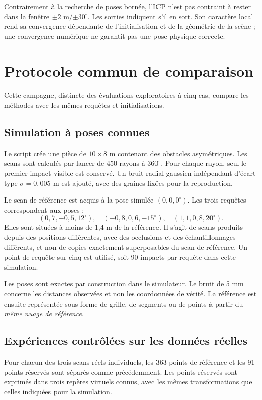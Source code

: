 \documentclass[11pt,a4paper]{article}
\newcommand{\code}[1]{\texttt{\detokenize{#1}}}
\begin{document}
Contrairement à la recherche de poses bornée, l'ICP n'est pas contraint
à rester dans la fenêtre $\pm2$ m/$\pm30^\circ$. Les sorties indiquent
s'il en sort. Son caractère local rend sa convergence dépendante de
l'initialisation et de la géométrie de la scène ; une convergence numérique
ne garantit pas une pose physique correcte.

\section{Protocole commun de comparaison}
Cette campagne, distincte des évaluations exploratoires à cinq cas,
compare les méthodes avec les mêmes requêtes et initialisations.

\subsection{Simulation à poses connues}
Le script \code{comparaison_localisation.py} crée une pièce de
$10\times8$ m contenant des obstacles asymétriques. Les scans sont calculés
par lancer de 450 rayons à $360^\circ$. Pour chaque rayon, seul le premier
impact visible est conservé. Un bruit radial gaussien indépendant d'écart-type
$\sigma=0{,}005$ m est ajouté, avec des graines fixées pour la reproduction.

Le scan de référence est acquis à la pose simulée $(0,0,0^\circ)$.
Les trois requêtes correspondent aux poses :
\[
 (0{,}7,-0{,}5,12^\circ),\quad
 (-0{,}8,0{,}6,-15^\circ),\quad
 (1{,}1,0{,}8,20^\circ).
\]
Elles sont situées à moins de 1,4 m de la référence. Il s'agit de scans
produits depuis des positions différentes, avec des occlusions et des
échantillonnages différents, et non de copies exactement superposables
du scan de référence. Un point de requête sur cinq est utilisé, soit
90 impacts par requête dans cette simulation.

Les poses sont exactes par construction dans le simulateur. Le bruit de
5 mm concerne les distances observées et non les coordonnées de vérité.
La référence est ensuite représentée sous forme de grille, de segments
ou de points à partir du \emph{même nuage de référence}.

\subsection{Expériences contrôlées sur les données réelles}
Pour chacun des trois scans réels individuels, les 363 points de référence
et les 91 points réservés sont séparés comme précédemment. Les points
réservés sont exprimés dans trois repères virtuels connus, avec les mêmes
transformations que celles indiquées pour la simulation.
\end{document}
